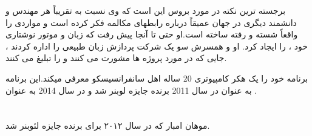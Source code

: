 \documentclass[14pt,a4paper]{report}
\begin{document}
 برجسته ترین نکته در مورد بروس این است که وی نسبت به تقریباً هر مهندس و دانشمند دیگری در جهان عمیقاً درباره رابطهای مکالمه فکر کرده است و مواردی را واقعاً شسته و رفته ساخته است.او حتی تا آنجا پیش رفت که زبان و موتور نوشتاری خود ،  را ایجاد کرد. او و همسرش سو یک شرکت پردازش زبان طبیعی  را اداره کردند ، جایی که در مورد پروژه ها مشورت می کنند و  را تبلیغ می کنند. 
 
 برنامه  خود را یک هکر کامپیوتری 20 ساله اهل سانفرانسیسکو معرفی میکند.این برنامه به عنوان   در سال 2011 برنده جایزه لوبنر شد و در سال 2014 به عنوان  .
  
 

 \section{}
 موهان امبار که در سال ۲۰۱۲ برای  برنده جایزه لئوبنر شد.
 	
 	
 
 	
\end{document}
